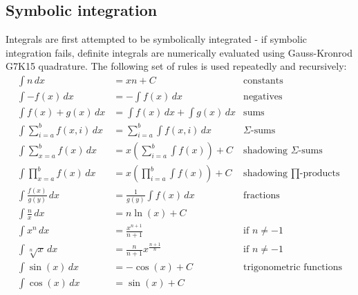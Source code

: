 \documentclass[oneside, a4paper]{article}
\begin{document}
\newpage
\subsection*{Symbolic integration}
Integrals are first attempted to be symbolically integrated - if symbolic integration fails, definite integrals are numerically evaluated using Gauss-Kronrod G7K15 quadrature.
The following set of rules is used repeatedly and recursively:
\begin{align*}
    \int n \,dx                     & = x n + C                                                    & \text{constants}                           \\
    \int -f(x) \,dx                 & = - \int f(x) \,dx                                           & \text{negatives}                           \\
    \int f(x) + g(x) \,dx           & = \int f(x) \,dx  + \int g(x) \,dx                           & \text{sums}                                \\
    \int \sum_{i=a}^{b} f(x,i) \,dx & = \sum_{i=a}^{b} \int f(x,i) \,dx                            & \text{$\Sigma$-sums}                       \\
    \int \sum_{x=a}^{b} f(x) \,dx   & = x \left(\sum_{i=a}^{b} \int f(x)\right) +C                 & \text{shadowing $\Sigma$-sums}             \\
    \int \prod_{x=a}^{b} f(x) \,dx  & = x \left(\prod_{i=a}^{b} \int f(x)\right) +C                & \text{shadowing $\prod$-products}          \\
    \int \frac{f(x)}{g(y)} \,dx     & = \frac{1}{g(y)} \int f(x) \,dx                              & \text{fractions}                           \\
    \int \frac{n}{x} \,dx           & = n \ln(x)     +C                                            & \text{}                                    \\
    \int x^{n} \,dx                 & = \frac{x^{n+1}}{n+1}                                        & \text{if $n\neq -1$}                       \\
    \int \sqrt[n]{x} \,dx           & =  \frac{n}{n+1} x^{\frac{n+1}{n}}                           & \text{if $n\neq -1$}                       \\
    \int \sin(x) \,dx               & = -\cos(x)                                       + C         & \text{trigonometric functions}             \\
    \int \cos(x) \,dx               & = \sin(x)                                        + C         & \text{}                                    \\

\end{align*}
\end{document}

